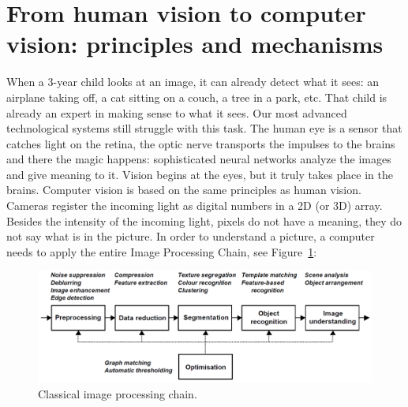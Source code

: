 \section{From human vision to computer vision: principles and mechanisms \label{sec:mechanisms}}
When a 3-year child looks at an image, it can already detect what it sees: an airplane taking off, a cat sitting on a couch, a tree in a park, etc. That child is already an expert in making sense to what it sees. Our most advanced technological systems still struggle with this task.
The human eye is a sensor that catches light on the retina, the optic nerve transports the impulses to the brains and there the magic happens: sophisticated neural networks analyze the images and give meaning to it. Vision begins at the eyes, but it truly takes place in the brains. 
Computer vision is based on the same principles as human vision. Cameras register the incoming light as digital numbers in a 2D (or 3D) array. Besides the intensity of the incoming light, pixels do not have a meaning, they do not say what is in the picture. In order to understand a picture, a computer needs to apply the entire Image Processing Chain, see Figure~\ref{fig:imProChain}:

\begin{figure}[h!]
	\centering
	\includegraphics[width=\textwidth]{../figures/imageProcessingChain}
	\caption{Classical image processing chain.  \cite{Egmont-Petersen2002} 
		\label{fig:imProChain}}
\end{figure}

